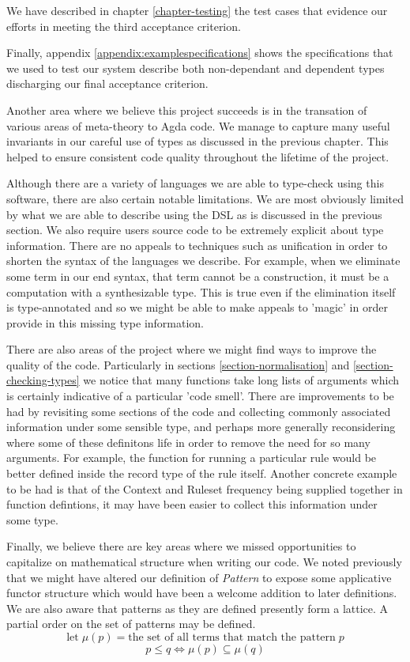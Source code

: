 We have described in chapter \ref{chapter-testing} the test cases that
evidence our efforts in meeting the third acceptance criterion.

Finally, appendix \ref{appendix:examplespecifications} shows the
specifications that we used to test our system describe both
non-dependant and dependent types discharging our final acceptance
criterion.

Another area where we believe this project succeeds is in the
transation of various areas of meta-theory to Agda code. We manage to
capture many useful invariants in our careful use of types as
discussed in the previous chapter. This helped to ensure consistent
code quality throughout the lifetime of the project.

Although there are a variety of languages we are able to type-check
using this software, there are also certain notable limitations. We
are most obviously limited by what we are able to describe using the
DSL as is discussed in the previous section. We also require users
source code to be extremely explicit about type information. There are
no appeals to techniques such as unification in order to shorten the
syntax of the languages we describe. For example, when we eliminate
some term in our end syntax, that term cannot be a construction, it
must be a computation with a synthesizable type. This is true even if
the elimination itself is type-annotated and so we might be able to
make appeals to 'magic' in order provide in this missing type
information.

There are also areas of the project where we might find ways to
improve the quality of the code. Particularly in sections
\ref{section-normalisation} and \ref{section-checking-types} we notice
that many functions take long lists of arguments which is certainly
indicative of a particular 'code smell'. There are improvements to be
had by revisiting some sections of the code and collecting commonly
associated information under some sensible type, and perhaps more
generally reconsidering where some of these definitons life in order
to remove the need for so many arguments. For example, the function
for running a particular rule would be better defined inside the
record type of the rule itself. Another concrete example to be had is
that of the Context and Ruleset frequency being supplied together in
function defintions, it may have been easier to collect this
information under some type.

Finally, we believe there are key areas where we missed opportunities
to capitalize on mathematical structure when writing our
code. We noted previously that we might have altered 
our definition of \emph{Pattern} to expose some applicative functor
structure which would have been a welcome addition to later
definitions. We are also aware that patterns as they are defined
presently form a lattice. A partial order on the set of patterns may
be defined.
$$
\mbox{let} \;μ(p) = \mbox{the set of all terms that match the pattern}\;p
$$
$$
p \leq q \iff \mu (p) \subseteq  \mu (q)
$$

